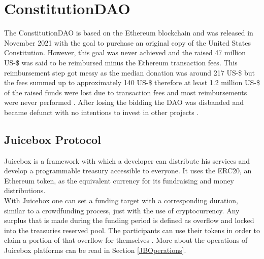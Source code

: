 \documentclass[a4paper,12pt]{report}
\begin{document}
	\section{ConstitutionDAO}
	\startsection
	    The ConstitutionDAO is based on the Ethereum blockchain and was released in November 2021 with the goal to purchase an original copy of the United States Constitution. However, this goal was never achieved and the raised 47 million US-\$ was said to be reimbursed minus the Ethereum transaction fees. This reimbursement step got messy as the median donation was around 217 US-\$ but the fees summed up to approximately 140 US-\$ therefore at least 1.2 million US-\$ of the raised funds were lost due to transaction fees and most reimbursements were never performed \parencite{JK21}. After losing the bidding the DAO was disbanded and became defunct with no intentions to invest in other projects \parencite{MF22}.
	    \subsection[Juicebox Protocol]{Juicebox Protocol \cite{JuiceBoxDoc}} \label{Juicebox}
	    \startsubsection
	        Juicebox is a framework with which a developer can distribute his services and develop a programmable treasury accessible to everyone. It uses the ERC20, an Ethereum token, as the equivalent currency for its fundraising and money distributions. \\
	        With Juicebox one can set a funding target with a corresponding duration, similar to a crowdfunding process, just with the use of cryptocurrency. Any surplus that is made during the funding period is defined as overflow and locked into the treasuries reserved pool. The participants can use their tokens in order to claim a portion of that overflow for themselves \parencite{JuiceBoxHowTo}. More about the operations of Juicebox platforms can be read in Section \ref{JBOperations}.
	    \closesection
\end{document}
